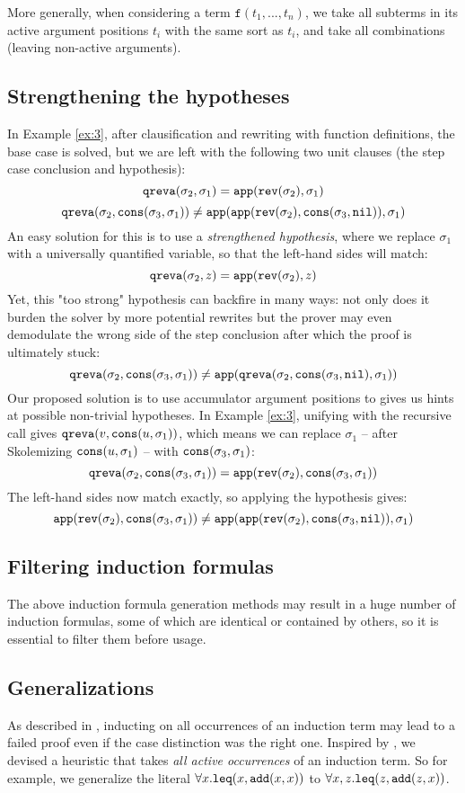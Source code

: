 More generally, when considering a term $\mathtt{f}(t_1,...,t_n)$, we take all subterms in its active argument positions $t_i$ with the same sort as $t_i$, and take all combinations (leaving non-active arguments).
\subsection{Strengthening the hypotheses}
In Example \ref{ex:3}, after clausification and rewriting with function definitions, the base case is solved, but we are left with the following two unit clauses (the step case conclusion and hypothesis):
$$\mathtt{qreva}(\sigma_2,\sigma_1)=\mathtt{app}(\mathtt{rev}(\sigma_2),\sigma_1)$$
$$\mathtt{qreva}(\sigma_2,\mathtt{cons}(\sigma_3,\sigma_1))\neq\mathtt{app}(\mathtt{app}(\mathtt{rev}(\sigma_2),\mathtt{cons}(\sigma_3,\mathtt{nil})),\sigma_1)$$
An easy solution for this is to use a \textit{strengthened hypothesis}, where we replace $\sigma_1$ with a universally quantified variable, so that the left-hand sides will match:
$$\mathtt{qreva}(\sigma_2,z)=\mathtt{app}(\mathtt{rev}(\sigma_2),z)$$
Yet, this "too strong" hypothesis can backfire in many ways: not only does it burden the solver by more potential rewrites but the prover may even demodulate the wrong side of the step conclusion after which the proof is ultimately stuck:
$$\mathtt{qreva}(\sigma_2,\mathtt{cons}(\sigma_3,\sigma_1))\neq\mathtt{app}(\mathtt{qreva}(\sigma_2,\mathtt{cons}(\sigma_3,\mathtt{nil}),\sigma_1))$$
Our proposed solution is to use accumulator argument positions to gives us hints at possible non-trivial hypotheses. In Example \ref{ex:3}, unifying with the recursive call gives $\mathtt{qreva}(v, \mathtt{cons}(u,\sigma_1))$, which means we can replace $\sigma_1$ -- after Skolemizing $\mathtt{cons}(u,\sigma_1)$ -- with $\mathtt{cons}(\sigma_3,\sigma_1)$:
$$\mathtt{qreva}(\sigma_2,\mathtt{cons}(\sigma_3,\sigma_1))=\mathtt{app}(\mathtt{rev}(\sigma_2),\mathtt{cons}(\sigma_3,\sigma_1))$$
The left-hand sides now match exactly, so applying the hypothesis gives:
$$\mathtt{app}(\mathtt{rev}(\sigma_2),\mathtt{cons}(\sigma_3,\sigma_1))\neq\mathtt{app}(\mathtt{app}(\mathtt{rev}(\sigma_2),\mathtt{cons}(\sigma_3,\mathtt{nil})),\sigma_1)$$

\subsection{Filtering induction formulas}
The above induction formula generation methods may result in a huge number of induction formulas, some of which are identical or contained by others, so it is essential to filter them before usage.

\subsection{Generalizations}
As described in \cite{vampiregeneralization}, inducting on all occurrences of an induction term may lead to a failed proof even if the case distinction was the right one. Inspired by \cite{cruanes}, we devised a heuristic that takes \textit{all active occurrences} of an induction term. So for example, we generalize the literal $\forall x.\mathtt{leq}(x,\mathtt{add}(x,x))$ to $\forall x,z.\mathtt{leq}(z,\mathtt{add}(z,x))$.

